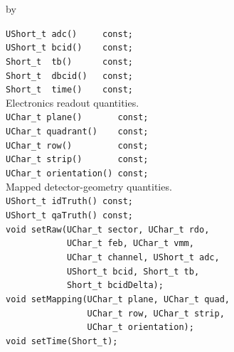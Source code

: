 \documentclass[twoside]{article}
\newcommand{\entrylabel}[1]{\mbox{\textbf{{#1}}}\hfil}%
\newenvironment{entry}
{\begin{list}{}%
    {\renewcommand{\makelabel}{\entrylabel}%
     \setlength{\labelwidth}{90pt}%
     \setlength{\leftmargin}{\labelwidth}
     \advance\leftmargin by \labelsep%
      }%
    }%
  {\end{list}}
\newcommand{\Entrylabel}[1]%
{\raisebox{0pt}[1ex][0pt]{\makebox[\labelwidth][l]%
    {\parbox[t]{\labelwidth}{\hspace{0pt}\textbf{{#1}}}}}}
\newenvironment{Entry}%
{\renewcommand{\entrylabel}{\Entrylabel}\begin{entry}}%
  {\end{entry}}
\begin{document}
\begin{Entry}
    \verb+UShort_t adc()     const;+\\
    \verb+UShort_t bcid()    const;+\\
    \verb+Short_t  tb()      const;+\\
    \verb+Short_t  dbcid()   const;+\\
    \verb+Short_t  time()    const;+\\
    Electronics readout quantities.\\[2pt]
    \verb+UChar_t plane()       const;+\\
    \verb+UChar_t quadrant()    const;+\\
    \verb+UChar_t row()         const;+\\
    \verb+UChar_t strip()       const;+\\
    \verb+UChar_t orientation() const;+\\
    Mapped detector-geometry quantities.\\[2pt]
    \verb+UShort_t idTruth() const;+\\
    \verb+UShort_t qaTruth() const;+\\
    \verb+void setRaw(UChar_t sector, UChar_t rdo,+\\
    \verb+            UChar_t feb, UChar_t vmm,+\\
    \verb+            UChar_t channel, UShort_t adc,+\\
    \verb+            UShort_t bcid, Short_t tb,+\\
    \verb+            Short_t bcidDelta);+\\
    \verb+void setMapping(UChar_t plane, UChar_t quad,+\\
    \verb+                UChar_t row, UChar_t strip,+\\
    \verb+                UChar_t orientation);+\\
    \verb+void setTime(Short_t);+\\
\end{Entry}
\clearpage

\end{document}
